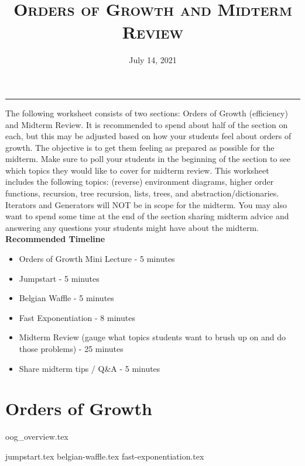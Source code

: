 \documentclass{exam}
\title{\textsc{Orders of Growth and Midterm Review}}
\date{July 14, 2021}
\begin{document}
\maketitle
\rule{\textwidth}{0.15em}
\fontsize{12}{15}\selectfont


\begin{guide}
    The following worksheet consists of two sections: Orders of Growth (efficiency) and Midterm Review.
    It is recommended to spend about half of the section on each, but this may be adjusted based on how your
    students feel about orders of growth. The objective is to get them feeling as prepared as possible for the midterm.
    \newline\newline
    Make sure to poll your students in the beginning of the section to see which topics they would like to cover for midterm review.
    This worksheet includes the following topics: (reverse) environment diagrams, higher order functions, recursion, tree recursion, lists, trees, and abstraction/dictionaries.
    Iterators and Generators will NOT be in scope for the midterm. You may also want to spend some time at the end of the section sharing midterm advice and answering any questions
    your students might have about the midterm.
    \textbf{Recommended Timeline}
    \begin{itemize}
        \item Orders of Growth Mini Lecture - 5 minutes
        \item Jumpstart - 5 minutes
        \item Belgian Waffle - 5 minutes
        \item Fast Exponentiation - 8 minutes
        \item Midterm Review (gauge what topics students want to brush up on and do those problems) - 25 minutes
        \item Share midterm tips / Q&A - 5 minutes
    \end{itemize}
\end{guide}

\section{Orders of Growth}
{oog_overview.tex}
\begin{questions}
{jumpstart.tex}
{belgian-waffle.tex}
{fast-exponentiation.tex}
\end{questions}
\end{document}

